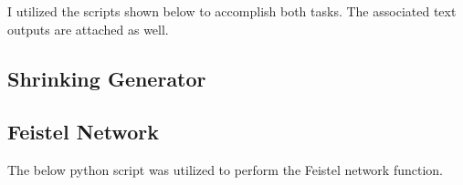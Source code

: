 \documentclass{article}
\begin{document}
I utilized the scripts shown below to accomplish both tasks.
The associated text outputs are attached as well.

\subsection*{Shrinking Generator}





\newpage
\subsection*{Feistel Network}
The below python script was utilized to perform the Feistel network function.



\end{document}
